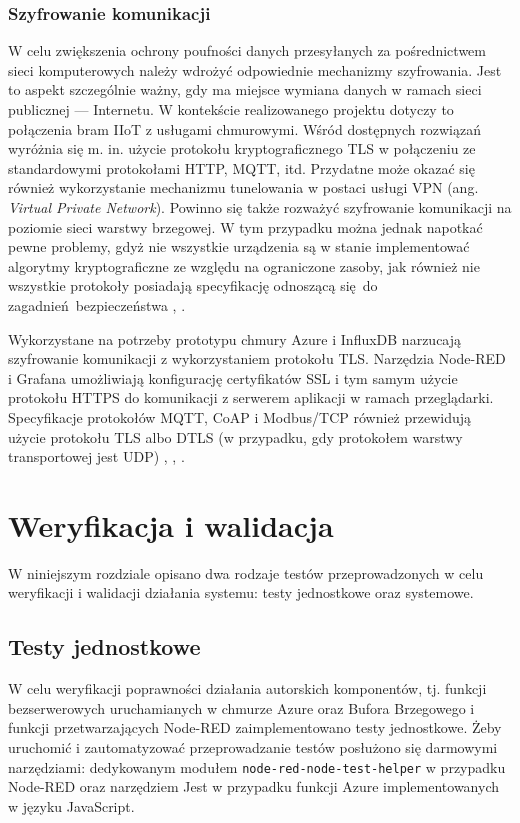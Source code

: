 \documentclass[a4paper, 12pt, twoside]{article}
\begin{document}
\subsubsection{Szyfrowanie komunikacji}

W celu zwiększenia ochrony poufności danych przesyłanych za pośrednictwem sieci
komputerowych należy wdrożyć odpowiednie mechanizmy szyfrowania. Jest to aspekt
szczególnie ważny, gdy ma miejsce wymiana danych w ramach sieci publicznej --- Internetu.
W kontekście realizowanego projektu dotyczy to połączenia bram IIoT z usługami chmurowymi.
Wśród dostępnych rozwiązań wyróżnia się m. in. użycie protokołu kryptograficznego TLS w połączeniu
ze standardowymi protokołami HTTP, MQTT, itd. Przydatne może okazać się również
wykorzystanie mechanizmu tunelowania w postaci usługi VPN (ang. \emph{Virtual Private Network}).
Powinno się także rozważyć szyfrowanie komunikacji na poziomie sieci warstwy brzegowej.
W tym przypadku można jednak napotkać pewne problemy, gdyż nie wszystkie urządzenia
są w stanie implementować algorytmy kryptograficzne ze względu
na ograniczone zasoby, jak również nie wszystkie protokoły posiadają specyfikację
odnoszącą się do zagadnień bezpieczeństwa \cite{isp}, \cite{intro-to-iot}.

Wykorzystane na potrzeby prototypu chmury Azure i InfluxDB narzucają szyfrowanie
komunikacji z wykorzystaniem protokołu TLS. Narzędzia Node-RED i Grafana
umożliwiają konfigurację certyfikatów SSL i tym samym użycie protokołu
HTTPS do komunikacji z serwerem aplikacji w ramach przeglądarki. Specyfikacje
protokołów MQTT, CoAP i Modbus/TCP również przewidują użycie protokołu TLS albo
DTLS (w przypadku, gdy protokołem warstwy transportowej jest UDP)
\cite{mqtt-tls}, \cite{modbus-tls}, \cite{coap-tls}.

\section{Weryfikacja i walidacja}\label{testy}

W niniejszym rozdziale opisano dwa rodzaje testów przeprowadzonych
w celu weryfikacji i walidacji działania systemu: testy jednostkowe oraz systemowe.

\subsection{Testy jednostkowe}

W celu weryfikacji poprawności działania autorskich komponentów, tj.
funkcji bezserwerowych uruchamianych w chmurze Azure oraz Bufora Brzegowego i funkcji przetwarzających Node-RED
zaimplementowano testy jednostkowe. Żeby uruchomić i zautomatyzować przeprowadzanie
testów posłużono się darmowymi narzędziami: dedykowanym modułem \texttt{node-red-node-test-helper}
w przypadku Node-RED oraz narzędziem Jest w przypadku funkcji Azure implementowanych
w języku JavaScript.
\end{document}
